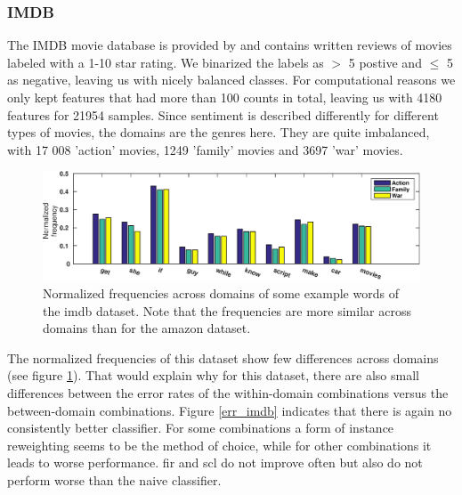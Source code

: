 \documentclass[twoside,11pt]{article}
\begin{document}
\subsubsection{IMDB}
The IMDB movie database is provided by \cite{maas2011learning} and contains written reviews of movies labeled with a 1-10 star rating. We binarized the labels as $>$ 5 postive and $\leq$ 5 as negative, leaving us with nicely balanced classes. For computational reasons we only kept features that had more than 100 counts in total, leaving us with 4180 features for 21954 samples. Since sentiment is described differently for different types of movies, the domains are the genres here. They are quite imbalanced, with 17 008 'action' movies, 1249 'family' movies and 3697 'war' movies.
					
\begin{figure}[ht]
\centering
\includegraphics[width=.9\textwidth]{images/eg_imdb.eps}
\caption{Normalized frequencies across domains of some example words of the imdb dataset. Note that the frequencies are more similar across domains than for the amazon dataset.}
\label{eg_imdb}
\end{figure}

The normalized frequencies of this dataset show few differences across domains (see figure \ref{eg_imdb}). That would explain why for this dataset, there are also small differences between the error rates of the within-domain combinations versus the between-domain combinations. Figure \ref{err_imdb} indicates that there is again no consistently better classifier. For some combinations a form of instance reweighting seems to be the method of choice, while for other combinations it leads to worse performance. {\sc fir} and {\sc scl} do not improve often but also do not perform worse than the naive classifier.
																
\end{document}
